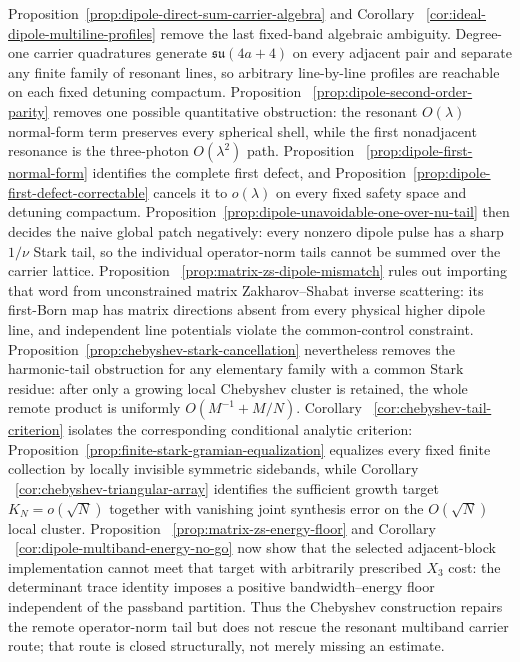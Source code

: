 \documentclass[11pt]{article}
\theoremstyle{remark}
\begin{document}
 Proposition~\ref{prop:dipole-direct-sum-carrier-algebra} and Corollary
 ~\ref{cor:ideal-dipole-multiline-profiles} remove the last fixed-band
 algebraic ambiguity.  Degree-one carrier quadratures generate
 $\mathfrak{su}(4a+4)$ on every adjacent pair and separate any finite family
 of resonant lines, so arbitrary line-by-line profiles are reachable on each
 fixed detuning compactum.  Proposition
 ~\ref{prop:dipole-second-order-parity} removes one possible quantitative
 obstruction: the resonant $O(\lambda)$ normal-form term preserves every
 spherical shell, while the first nonadjacent resonance is the
 three-photon $O(\lambda^2)$ path.  Proposition
 ~\ref{prop:dipole-first-normal-form} identifies the complete first defect,
 and Proposition~\ref{prop:dipole-first-defect-correctable} cancels it to
 $o(\lambda)$ on every fixed safety space and detuning compactum.
 Proposition~\ref{prop:dipole-unavoidable-one-over-nu-tail} then decides the
 naive global patch negatively: every nonzero dipole pulse has a sharp
 $1/\nu$ Stark tail, so the individual operator-norm tails cannot be summed
 over the carrier lattice.  Proposition
 ~\ref{prop:matrix-zs-dipole-mismatch} rules out importing that word from
 unconstrained matrix Zakharov--Shabat inverse scattering: its first-Born
 map has matrix directions absent from every physical higher dipole line,
 and independent line potentials violate the common-control constraint.
 Proposition~\ref{prop:chebyshev-stark-cancellation} nevertheless removes the
 harmonic-tail obstruction for any elementary family with a common Stark
 residue: after only a growing local Chebyshev cluster is retained, the whole
 remote product is uniformly
 $O(M^{-1}+M/N)$.  Corollary
 ~\ref{cor:chebyshev-tail-criterion} isolates the corresponding conditional
 analytic criterion:
 Proposition~\ref{prop:finite-stark-gramian-equalization} equalizes every fixed
 finite collection by locally invisible symmetric sidebands, while Corollary
 ~\ref{cor:chebyshev-triangular-array} identifies the sufficient growth target
 $K_N=o(\sqrt N)$ together with vanishing joint synthesis error on the
 $O(\sqrt N)$ local cluster.  Proposition
 ~\ref{prop:matrix-zs-energy-floor} and Corollary
 ~\ref{cor:dipole-multiband-energy-no-go} now show that the selected
 adjacent-block implementation cannot meet that target with arbitrarily
 prescribed $X_3$ cost: the determinant trace identity imposes a positive
 bandwidth--energy floor independent of the passband partition.  Thus the
 Chebyshev construction repairs the remote operator-norm tail but does not
 rescue the resonant multiband carrier route; that route is closed
 structurally, not merely missing an estimate.
\end{document}
